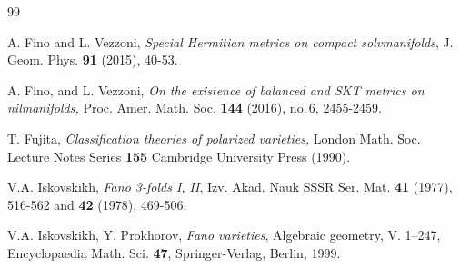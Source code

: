 \documentclass{amsart}
\numberwithin{equation}{section}
\theoremstyle{definition}
\renewcommand{\1}{\mathds{1}}
\renewcommand{\>}{\rightarrow}
\begin{document}
\begin{thebibliography}{99}

 A. Fino and L. Vezzoni,
\newblock \textit{Special Hermitian metrics on compact solvmanifolds},
\newblock J. Geom. Phys. {\bf 91} (2015), 40-53.

 A. Fino, and L. Vezzoni, \emph{On the existence of balanced and SKT metrics on nilmanifolds,} Proc. Amer. Math.
Soc. {\bf 144} (2016), no.\,6, 2455-2459.


 T. Fujita,
\newblock \textit{Classification theories of polarized varieties,}
\newblock London Math. Soc. Lecture Notes Series \textbf{155} Cambridge University Press (1990).



 V.A. Iskovskikh,
\newblock \textit{Fano 3-folds I, II},
\newblock Izv. Akad. Nauk SSSR Ser. Mat. \textbf{41} (1977), 516-562 and \textbf{42} (1978), 469-506.

 V.A. Iskovskikh, Y. Prokhorov,
\newblock \textit{Fano varieties},
\newblock Algebraic geometry, V. 1--247, Encyclopaedia Math. Sci. \textbf{47}, Springer-Verlag, Berlin, 1999.






\end{thebibliography}
\end{document}
